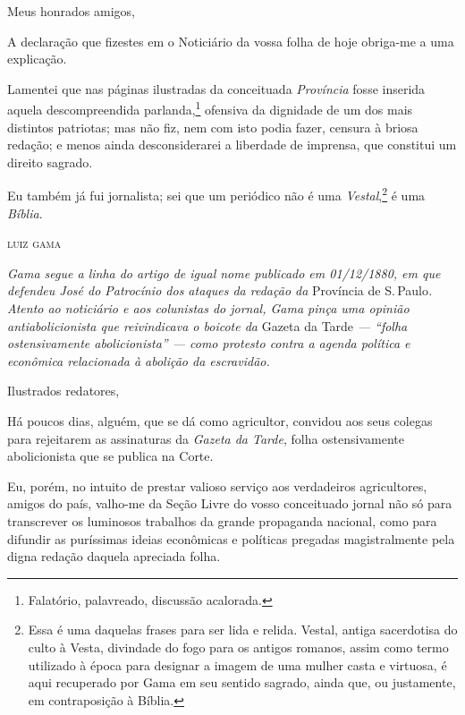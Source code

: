{Meus honrados amigos,

A declaração que fizestes em o Noticiário da vossa folha de hoje
obriga-me a uma explicação.

Lamentei que nas páginas ilustradas da conceituada \emph{Província}
fosse inserida aquela descompreendida parlanda,\footnote{Falatório,
  palavreado, discussão acalorada.} ofensiva da dignidade de um dos mais
distintos patriotas; mas não fiz, nem com isto podia fazer, censura à
briosa redação; e menos ainda desconsiderarei a liberdade de imprensa,
que constitui um direito sagrado.

Eu também já fui jornalista; sei que um periódico não é uma
\emph{Vestal},\footnote{Essa é uma daquelas frases para ser lida e relida.
  Vestal, antiga sacerdotisa do culto à Vesta, divindade do fogo para os
  antigos romanos, assim como termo utilizado à época para designar a
  imagem de uma mulher casta e virtuosa, é aqui recuperado por Gama em
  seu sentido sagrado, ainda que, ou justamente, em contraposição à
  Bíblia.} é uma \emph{Bíblia}.\medskip

\hfill\textsc{luiz gama}


\begin{resumo}
\emph{Gama segue a linha do artigo de igual nome publicado em
01/12/1880, em que defendeu José do Patrocínio dos ataques da redação
da} Província de S.\,Paulo\emph{. Atento ao noticiário e aos colunistas
do jornal, Gama pinça uma opinião antiabolicionista que reivindicava o
boicote da} Gazeta da Tarde \emph{--- ``folha ostensivamente
abolicionista'' --- como protesto contra a agenda política e econômica
relacionada à abolição da escravidão. }
\end{resumo}

Ilustrados redatores,

Há poucos dias, alguém, que se dá como agricultor, convidou aos seus
colegas para rejeitarem as assinaturas da \emph{Gazeta da Tarde}, folha
ostensivamente abolicionista que se publica na Corte.

Eu, porém, no intuito de prestar valioso serviço aos verdadeiros
agricultores, amigos do país, valho-me da Seção Livre do vosso
conceituado jornal não só para transcrever os luminosos trabalhos da
grande propaganda nacional, como para difundir as puríssimas ideias
econômicas e políticas pregadas magistralmente pela digna redação
daquela apreciada folha.

}
